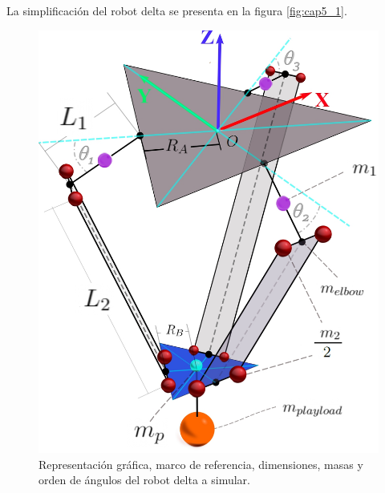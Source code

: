     \newpage
    
     La simplificación del robot delta se presenta en la figura \eqref{fig:cap5_1}.
    
    \begin{figure}[htb]
        \centering
        \includegraphics[width=0.87\linewidth]{Main/Chapter5/Images5/DIBUJO55.jpg}
        \caption{Representación gráfica, marco de referencia, dimensiones, masas y orden de ángulos del robot delta a simular.}
        \label{fig:cap5_1}
    \end{figure}
    
    
    